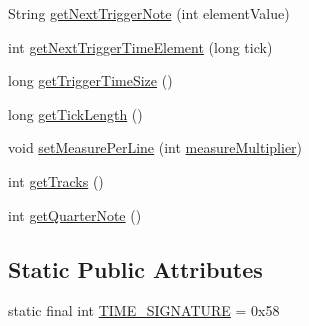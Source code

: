 \begin{DoxyCompactItemize}
\item 
String \hyperlink{classcom_1_1lclion_1_1midiparser_1_1_m_i_d_i_parser_a4669a62a8b0a61ee7cb351639cd5d357}{get\+Next\+Trigger\+Note} (int element\+Value)
\item 
int \hyperlink{classcom_1_1lclion_1_1midiparser_1_1_m_i_d_i_parser_acc6c9009b8fed2060c1b03fa051086d9}{get\+Next\+Trigger\+Time\+Element} (long tick)
\item 
long \hyperlink{classcom_1_1lclion_1_1midiparser_1_1_m_i_d_i_parser_aa9a3932117bdd0743daac84c2ca8e19a}{get\+Trigger\+Time\+Size} ()
\item 
long \hyperlink{classcom_1_1lclion_1_1midiparser_1_1_m_i_d_i_parser_a318c504fc464b620e829b6ed354cc922}{get\+Tick\+Length} ()
\item 
void \hyperlink{classcom_1_1lclion_1_1midiparser_1_1_m_i_d_i_parser_a6974b380083ade3bb6ce3d20a8f7592a}{set\+Measure\+Per\+Line} (int \hyperlink{classcom_1_1lclion_1_1midiparser_1_1_m_i_d_i_parser_a9a55cb81b8582eb4cbbc0a0ef91db56e}{measure\+Multiplier})
\item 
int \hyperlink{classcom_1_1lclion_1_1midiparser_1_1_m_i_d_i_parser_a0914f098f4ac38ddac1f9b57203a9241}{get\+Tracks} ()
\item 
int \hyperlink{classcom_1_1lclion_1_1midiparser_1_1_m_i_d_i_parser_a58cfc312af72ba770bca4aecc7e6c505}{get\+Quarter\+Note} ()
\end{DoxyCompactItemize}
\subsection*{Static Public Attributes}
\begin{DoxyCompactItemize}
\item 
static final int \hyperlink{classcom_1_1lclion_1_1midiparser_1_1_m_i_d_i_parser_ac4000b072e7a320337cc23bfc22de62d}{T\+I\+M\+E\+\_\+\+S\+I\+G\+N\+A\+T\+U\+R\+E} = 0x58
\end{DoxyCompactItemize}
